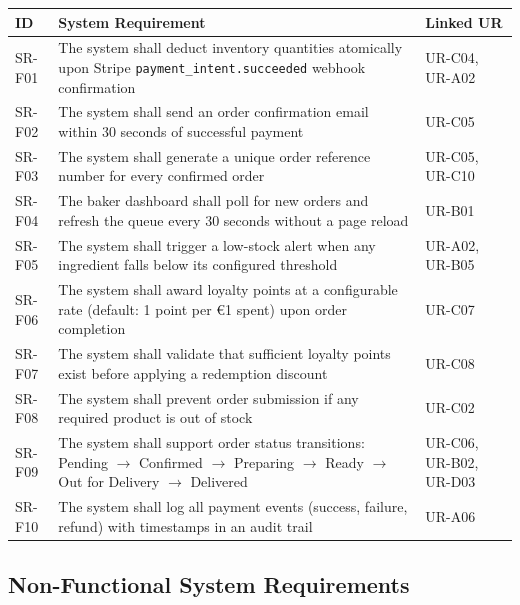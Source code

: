 \documentclass[12pt, a4paper]{report}
\begin{document}
\begin{longtable}{L{1.8cm} L{9cm} L{2.5cm}}
  \toprule
  \textbf{ID} & \textbf{System Requirement} & \textbf{Linked UR} \\
  \midrule
  \endhead
  \bottomrule
  \endfoot

  SR-F01 & The system shall deduct inventory quantities atomically upon Stripe \texttt{payment\_intent.succeeded} webhook confirmation & UR-C04, UR-A02 \\[4pt]
  SR-F02 & The system shall send an order confirmation email within 30 seconds of successful payment & UR-C05 \\[4pt]
  SR-F03 & The system shall generate a unique order reference number for every confirmed order & UR-C05, UR-C10 \\[4pt]
  SR-F04 & The baker dashboard shall poll for new orders and refresh the queue every 30 seconds without a page reload & UR-B01 \\[4pt]
  SR-F05 & The system shall trigger a low-stock alert when any ingredient falls below its configured threshold & UR-A02, UR-B05 \\[4pt]
  SR-F06 & The system shall award loyalty points at a configurable rate (default: 1 point per \euro{}1 spent) upon order completion & UR-C07 \\[4pt]
  SR-F07 & The system shall validate that sufficient loyalty points exist before applying a redemption discount & UR-C08 \\[4pt]
  SR-F08 & The system shall prevent order submission if any required product is out of stock & UR-C02 \\[4pt]
  SR-F09 & The system shall support order status transitions: Pending $\rightarrow$ Confirmed $\rightarrow$ Preparing $\rightarrow$ Ready $\rightarrow$ Out for Delivery $\rightarrow$ Delivered & UR-C06, UR-B02, UR-D03 \\[4pt]
  SR-F10 & The system shall log all payment events (success, failure, refund) with timestamps in an audit trail & UR-A06 \\

\end{longtable}

\subsection{Non-Functional System Requirements}
\end{document}
